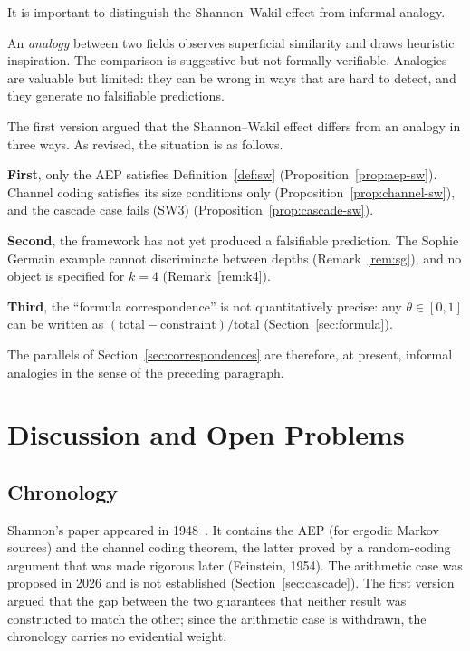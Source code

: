\documentclass[12pt]{amsart}
\theoremstyle{plain}
\theoremstyle{definition}
\theoremstyle{remark}
\begin{document}
It is important to distinguish the Shannon--Wakil effect from informal analogy.

An \emph{analogy} between two fields observes superficial similarity and draws
heuristic inspiration. The comparison is suggestive but not formally verifiable.
Analogies are valuable but limited: they can be wrong in ways that are hard to
detect, and they generate no falsifiable predictions.

The first version argued that the Shannon--Wakil effect differs from an analogy
in three ways. As revised, the situation is as follows.

\textbf{First}, only the AEP satisfies Definition~\ref{def:sw}
(Proposition~\ref{prop:aep-sw}). Channel coding satisfies its size conditions
only (Proposition~\ref{prop:channel-sw}), and the cascade case fails (SW3)
(Proposition~\ref{prop:cascade-sw}).

\textbf{Second}, the framework has not yet produced a falsifiable prediction.
The Sophie Germain example cannot discriminate between depths
(Remark~\ref{rem:sg}), and no object is specified for $k=4$
(Remark~\ref{rem:k4}).

\textbf{Third}, the ``formula correspondence'' is not quantitatively precise:
any $\theta \in [0,1]$ can be written as
$(\text{total} - \text{constraint})/\text{total}$
(Section~\ref{sec:formula}).

The parallels of Section~\ref{sec:correspondences} are therefore, at present,
informal analogies in the sense of the preceding paragraph.

\section{Discussion and Open Problems}

\subsection{Chronology}

Shannon's paper appeared in 1948~\cite{Shannon1948}. It contains the AEP (for
ergodic Markov sources) and the channel coding theorem, the latter proved by a
random-coding argument that was made rigorous later (Feinstein, 1954). The
arithmetic case was proposed in 2026 and is not established
(Section~\ref{sec:cascade}). The first version argued that the gap between the
two guarantees that neither result was constructed to match the other; since the
arithmetic case is withdrawn, the chronology carries no evidential weight.
\end{document}

